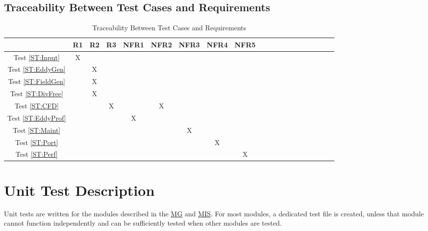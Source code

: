 \documentclass[12pt, titlepage]{article}
\begin{document}
\newpage
\subsection{Traceability Between Test Cases and Requirements}
\begin{table}[h!]
  \centering
  \begin{tabular}{|c|c|c|c|c|c|c|c|c|c|c|c|c|c|c|c|c|c|c|c|}
  \hline
                            & R1 & R2 & R3 & NFR1 & NFR2 & NFR3 & NFR4 & NFR5 \\
  \hline
  Test \ref{ST:Input}     & X  &    &    &      &      &      &      &      \\\hline
  Test \ref{ST:EddyGen}   &    & X  &    &      &      &      &      &      \\\hline
  Test \ref{ST:FieldGen}  &    & X  &    &      &      &      &      &      \\\hline
  Test \ref{ST:DivFree}   &    & X  &    &      &      &      &      &      \\\hline
  Test \ref{ST:CFD}       &    &    & X  &      & X    &      &      &      \\\hline
  Test \ref{ST:EddyProf}  &    &    &    & X    &      &      &      &      \\\hline
  Test \ref{ST:Maint}     &    &    &    &      &      & X    &      &      \\\hline
  Test \ref{ST:Port}      &    &    &    &      &      &      & X    &      \\\hline
  Test \ref{ST:Perf}      &    &    &    &      &      &      &      & X    \\\hline
  \end{tabular}
  \caption{Traceability Between Test Cases and Requirements}
  \label{Table:A_trace}
\end{table}


\section{Unit Test Description}

Unit tests are written for the modules described in the \href{https://github.com/omltcat/turbulent-flow/blob/main/docs/Design/SoftArchitecture/MG.pdf}{MG} and \href{https://github.com/omltcat/turbulent-flow/blob/main/docs/Design/SoftDetailedDes/MIS.pdf}{MIS}. For most modules, a dedicated test file is created, unless that module cannot function independently and can be sufficiently tested when other modules are tested.
\end{document}
